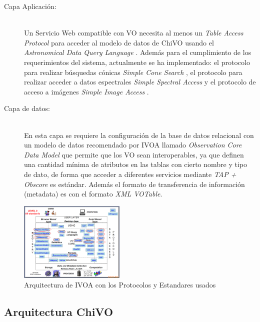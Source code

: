 \begin{description}
    \item[Capa Aplicación:] \hfill \\
        Un Servicio Web compatible con VO necesita al menos un \emph{Table Access
        Protocol} \cite{dowler2010table} para acceder al modelo de datos de ChiVO usando el
        \emph{Astronomical Data Query Language} \cite{yasuda2004astronomical}.
        Además para el cumplimiento de los requerimientos del sistema,
        actualmente se ha implementado:
        el protocolo para realizar búsquedas cónicas \emph{Simple Cone Search}
        \cite{williams2008simple}, el protocolo para realizar acceder a datos
        espectrales \emph{Simple Spectral Access} \cite{tody2008simple} y el protocolo de
        acceso a imágenes \emph{Simple Image Access} \cite{tody2004simple}.

    \item[Capa de datos:] \hfill \\
        En esta capa se requiere la configuración de la base de datos relacional con
        un modelo de datos recomendado por IVOA llamado \emph{Observation Core Data
        Model} \cite{louys2011ivoa} que permite que los VO sean interoperables,
        ya que definen una cantidad mínima de atributos en las tablas con cierto
        nombre y tipo de dato, de forma que acceder a diferentes servicios mediante
        \emph{TAP + Obscore} es estándar.
        Además el formato de transferencia de información (metadata) es con el
        formato \emph{XML VOTable}.
\end{description}

\begin{figure}[ht]
    \centering
    \includegraphics[width=0.45\textwidth]{images/arquitectura_2.png}
    \caption{Arquitectura de IVOA con los Protocolos y Estandares usados}
    \label{fig:ivoarch}
\end{figure}

\subsection{Arquitectura ChiVO}

